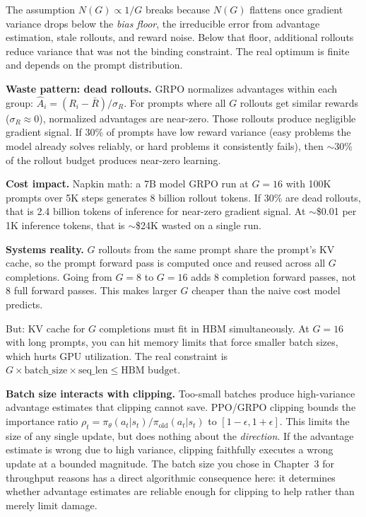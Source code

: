 The assumption $N(G) \propto 1/G$ breaks because $N(G)$ flattens once gradient variance drops below the \textit{bias floor}, the irreducible error from advantage estimation, stale rollouts, and reward noise. Below that floor, additional rollouts reduce variance that was not the binding constraint. The real optimum is finite and depends on the prompt distribution.

\textbf{Waste pattern: dead rollouts.} GRPO normalizes advantages within each group: $\hat{A}_i = (R_i - \bar{R}) / \sigma_R$. For prompts where all $G$ rollouts get similar rewards ($\sigma_R \approx 0$), normalized advantages are near-zero. Those rollouts produce negligible gradient signal. If 30\% of prompts have low reward variance (easy problems the model already solves reliably, or hard problems it consistently fails), then $\sim$30\% of the rollout budget produces near-zero learning.

\textbf{Cost impact.} Napkin math: a 7B model GRPO run at $G = 16$ with 100K prompts over 5K steps generates 8 billion rollout tokens. If 30\% are dead rollouts, that is 2.4 billion tokens of inference for near-zero gradient signal. At $\sim$\$0.01 per 1K inference tokens, that is $\sim$\$24K wasted on a single run.

\textbf{Systems reality.} $G$ rollouts from the same prompt share the prompt's KV cache, so the prompt forward pass is computed once and reused across all $G$ completions. Going from $G = 8$ to $G = 16$ adds 8 completion forward passes, not 8 full forward passes. This makes larger $G$ cheaper than the naive cost model predicts.

But: KV cache for $G$ completions must fit in HBM simultaneously. At $G = 16$ with long prompts, you can hit memory limits that force smaller batch sizes, which hurts GPU utilization. The real constraint is $G \times \text{batch\_size} \times \text{seq\_len} \leq \text{HBM budget}$.

\textbf{Batch size interacts with clipping.} Too-small batches produce high-variance advantage estimates that clipping cannot save. PPO/GRPO clipping bounds the importance ratio $\rho_t = \pi_\theta(a_t|s_t) / \pi_{\mathrm{old}}(a_t|s_t)$ to $[1 - \epsilon, 1 + \epsilon]$. This limits the size of any single update, but does nothing about the \textit{direction}. If the advantage estimate is wrong due to high variance, clipping faithfully executes a wrong update at a bounded magnitude. The batch size you chose in Chapter~3 for throughput reasons has a direct algorithmic consequence here: it determines whether advantage estimates are reliable enough for clipping to help rather than merely limit damage.

